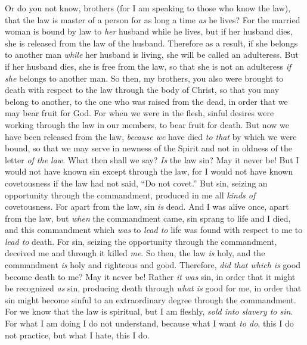 \begin{biblechapter} %
 Or do you not know, brothers (for I am speaking to those who know the law), that the law is master of a person for as long a time \textit{as} he lives?
\verse For the married woman is bound by law to \textit{her} husband while he lives, but if her husband dies, she is released from the law of the husband.
\verse Therefore as a result, if she belongs to another man \textit{while} her husband is living, she will be called an adulteress. But if her husband dies, she is free from the law, so that she is not an adulteress \textit{if she} belongs to another man.
\verse So then, my brothers, you also were brought to death with respect to the law through the body of Christ, so that you may belong to another, to the one who was raised from the dead, in order that we may bear fruit for God.
\verse For when we were in the flesh, sinful desires were working through the law in our members, to bear fruit for death.
\verse But now we have been released from the law, \textit{because we} have died \textit{to that} by which we were bound, so that we may serve in newness of the Spirit and not in oldness of the letter \textit{of the law}.
 What then shall we say? \textit{Is} the law sin? May it never be! But I would not have known sin except through the law, for I would not have known covetousness if the law had not said, “Do not covet.”
\verse But sin, seizing an opportunity through the commandment, produced in me all \textit{kinds of} covetousness. For apart from the law, sin \textit{is} dead.
\verse And I was alive once, apart from the law, but \textit{when} the commandment came, sin sprang to life
\verse and I died, and this commandment which \textit{was} to \textit{lead to} life was found with respect to me to \textit{lead to} death.
\verse For sin, seizing the opportunity through the commandment, deceived me and through it killed \textit{me}.
\verse So then, the law \textit{is} holy, and the commandment \textit{is} holy and righteous and good.
 Therefore, \textit{did that which is} good become death to me? May it never be! Rather \textit{it was} sin, in order that it might be recognized \textit{as} sin, producing death through \textit{what is} good for me, in order that sin might become sinful to an extraordinary degree through the commandment.
\verse For we know that the law is spiritual, but I am fleshly, \textit{sold into slavery to sin}.
\verse For what I am doing I do not understand, because what I want \textit{to do}, this I do not practice, but what I hate, this I do.

\end{biblechapter}
